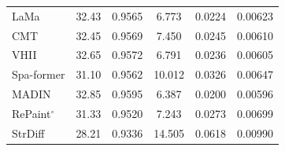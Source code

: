 \begin{table}[p]
\begin{tabular}{@{}lccccc@{}}
LaMa & 32.43 & 0.9565 & 6.773 & 0.0224 & 0.00623 \\
CMT & 32.45 & 0.9569 & 7.450 & 0.0245 & 0.00610 \\
VHII & 32.65 & 0.9572 & 6.791 & 0.0236 & 0.00605 \\
Spa-former & 31.10 & 0.9562 & 10.012 & 0.0326 & 0.00647 \\
MADIN & 32.85 & 0.9595 & 6.387 & 0.0200 & 0.00596 \\
RePaint$^{\circ}$ & 31.33 & 0.9520 & 7.243 & 0.0273 & 0.00699 \\
StrDiff & 28.21 & 0.9336 & 14.505 & 0.0618 & 0.00990 \\
\bottomrule
\end{tabular}
\end{table}